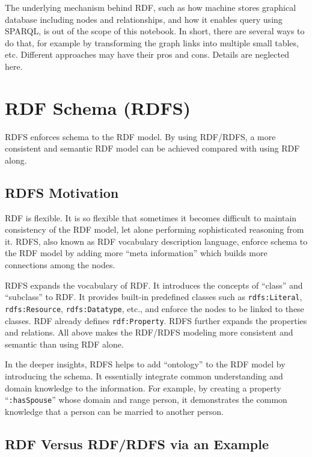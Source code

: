 The underlying mechanism behind RDF, such as how machine stores graphical database including nodes and relationships, and how it enables query using SPARQL, is out of the scope of this notebook. In short, there are several ways to do that, for example by transforming the graph links into multiple small tables, etc. Different approaches may have their pros and cons. Details are neglected here.

\section{RDF Schema (RDFS)}

RDFS enforces schema to the RDF model. By using RDF/RDFS, a more consistent and semantic RDF model can be achieved compared with using RDF along.

\subsection{RDFS Motivation}

RDF is flexible. It is so flexible that sometimes it becomes difficult to maintain consistency of the RDF model, let alone performing sophisticated reasoning from it. RDFS, also known as RDF vocabulary description language, enforce schema to the RDF model by adding more ``meta information'' which builds more connections among the nodes.

RDFS expands the vocabulary of RDF. It introduces the concepts of ``class'' and ``subclass'' to RDF. It provides built-in predefined classes such as \verb|rdfs:Literal|, \verb|rdfs:Resource|, \verb|rdfs:Datatype|, etc., and enforce the nodes to be linked to these classes. RDF already defines \verb|rdf:Property|. RDFS further expands the properties and relations. All above makes the RDF/RDFS modeling more consistent and semantic than using RDF alone.

In the deeper insights, RDFS helps to add ``ontology'' to the RDF model by introducing the schema. It essentially integrate common understanding and domain knowledge to the information. For example, by creating a property ``\verb|:hasSpouse|'' whose domain and range person, it demonstrates the common knowledge that a person can be married to another person.

\subsection{RDF Versus RDF/RDFS via an Example} \label{subsec:rdfvsrdfs}

